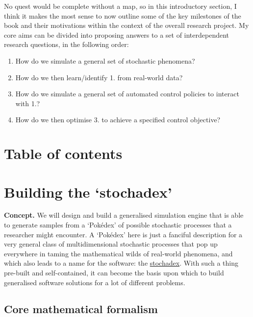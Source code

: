 \documentclass{book}
\begin{document}
No quest would be complete without a map, so in this introductory section, I think it makes the most sense to now outline some of the key milestones of the book and their motivations within the context of the overall research project. My core aims can be divided into proposing answers to a set of interdependent research questions, in the following order:

\begin{enumerate} 
\item{How do we simulate a general set of stochastic phenomena?}
\item{How do we then learn/identify 1. from real-world data?}
\item{How do we simulate a general set of automated control policies to interact with 1.?}
\item{How do we then optimise 3. to achieve a specified control objective?} 
\end{enumerate}


\chapter*{Table of contents}
\vspace*{-3cm}
{\sffamily \tableofcontents}
\mainmatter



\chapter{\sffamily Building the `stochadex'}

{\bfseries\sffamily Concept.} We will design and build a generalised simulation engine that is able to generate samples from a `Pokédex' of possible stochastic processes that a researcher might encounter. A `Pokédex' here is just a fanciful description for a very general class of multidimensional stochastic processes that pop up everywhere in taming the mathematical wilds of real-world phenomena, and which also leads to a name for the software: the \href{https://github.com/umbralcalc/stochadex}{stochadex}. With such a thing pre-built and self-contained, it can become the basis upon which to build generalised software solutions for a lot of different problems.

\section{\sffamily Core mathematical formalism}
\end{document}
